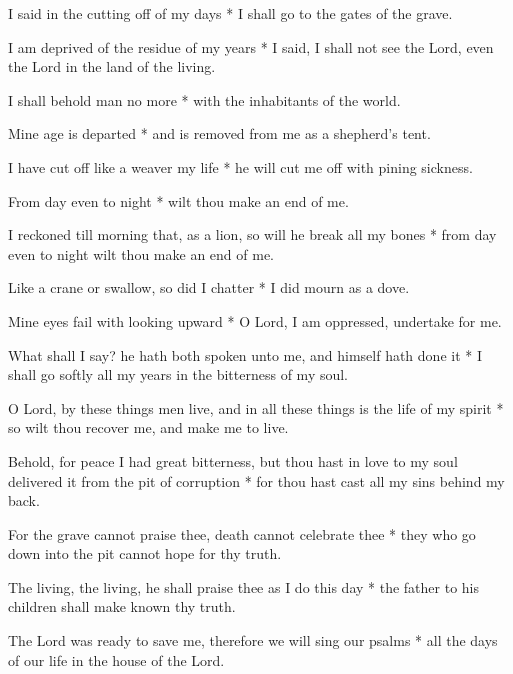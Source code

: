 I said in the cutting off of my days * I shall go to the gates of the grave.

I am deprived of the residue of my years * I said, I shall not see the Lord, even the Lord in the land of the living.

I shall behold man no more * with the inhabitants of the world.

Mine age is departed * and is removed from me as a shepherd's tent.

I have cut off like a weaver my life * he will cut me off with pining sickness.

From day even to night * wilt thou make an end of me.

I reckoned till morning that, as a lion, so will he break all my bones * from day even to night wilt thou make an end of me.

Like a crane or swallow, so did I chatter * I did mourn as a dove.

Mine eyes fail with looking upward * O Lord, I am oppressed, undertake for me.

What shall I say? he hath both spoken unto me, and himself hath done it * I shall go softly all my years in the bitterness of my soul.

O Lord, by these things men live, and in all these things is the life of my spirit * so wilt thou recover me, and make me to live.

Behold, for peace I had great bitterness, but thou hast in love to my soul delivered it from the pit of corruption * for thou hast cast all my sins behind my back.

For the grave cannot praise thee, death cannot celebrate thee * they who go down into the pit cannot hope for thy truth.

The living, the living, he shall praise thee as I do this day * the father to his children shall make known thy truth.

The Lord was ready to save me, therefore we will sing our psalms * all the days of our life in the house of the Lord.
